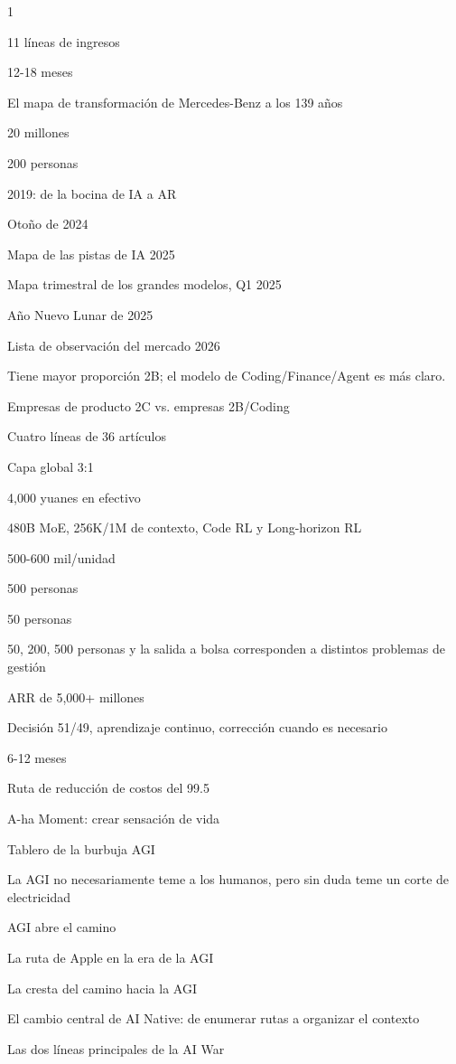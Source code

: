 \documentclass{article}
\begin{document}
1%

11 líneas de ingresos

12-18 meses

El mapa de transformación de Mercedes-Benz a los 139 años

20 millones

200 personas

2019: de la bocina de IA a AR

Otoño de 2024

Mapa de las pistas de IA 2025

Mapa trimestral de los grandes modelos, Q1 2025

Año Nuevo Lunar de 2025

Lista de observación del mercado 2026

Tiene mayor proporción 2B; el modelo de Coding/Finance/Agent es más claro.

Empresas de producto 2C vs. empresas 2B/Coding

Cuatro líneas de 36 artículos

Capa global 3:1

4,000 yuanes en efectivo

480B MoE, 256K/1M de contexto, Code RL y Long-horizon RL

500-600 mil/unidad

500 personas

50 personas

50, 200, 500 personas y la salida a bolsa corresponden a distintos problemas de gestión

ARR de 5,000+ millones

Decisión 51/49, aprendizaje continuo, corrección cuando es necesario

6-12 meses

Ruta de reducción de costos del 99.5%

A-ha Moment: crear sensación de vida

Tablero de la burbuja AGI

La AGI no necesariamente teme a los humanos, pero sin duda teme un corte de electricidad

AGI abre el camino

La ruta de Apple en la era de la AGI

La cresta del camino hacia la AGI

El cambio central de AI Native: de enumerar rutas a organizar el contexto

Las dos líneas principales de la AI War
\end{document}
